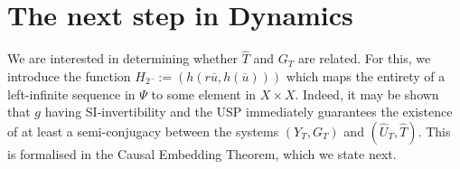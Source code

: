 
\section{The next step in Dynamics}





We are interested in determining whether $\widehat{T}$ and $G_T$ are related. For this, we introduce  the function ${H_2{\overline{}} := (h(r\overline{u}, h(\overline{u})))}$ which maps the entirety of a left-infinite sequence in $\Psi$ to some element in $X\times{X}$. 
Indeed, it may be shown that $g$ having SI-invertibility and the USP immediately guarantees the existence of at least a semi-conjugacy between the systems $(Y_T, G_T)$ and $(\widehat{U}_T, \widehat{T})$.
This is formalised in the Causal Embedding Theorem, which we state next.

